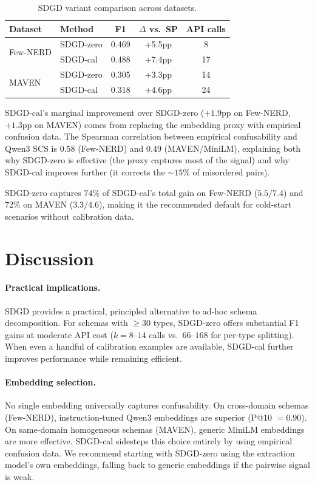 \documentclass[11pt,a4paper]{article}
\begin{document}
\begin{table}[t]
\centering
\small
\caption{SDGD variant comparison across datasets.}
\label{tab:sdgd-variants}
\begin{tabular}{llccc}
\toprule
Dataset & Method & F1 & $\Delta$ vs.\ SP & API calls \\
\midrule
\multirow{2}{*}{Few-NERD} & SDGD-zero & 0.469 & +5.5pp & 8 \\
                          & SDGD-cal  & 0.488 & +7.4pp & 17 \\
\midrule
\multirow{2}{*}{MAVEN}    & SDGD-zero & 0.305 & +3.3pp & 14 \\
                          & SDGD-cal  & 0.318 & +4.6pp & 24 \\
\bottomrule
\end{tabular}
\end{table}

SDGD-cal's marginal improvement over SDGD-zero ($+1.9$pp on Few-NERD, $+1.3$pp on MAVEN) comes from replacing the embedding proxy with empirical confusion data.
The Spearman correlation between empirical confusability and Qwen3 SCS is $0.58$ (Few-NERD) and $0.49$ (MAVEN/MiniLM), explaining both why SDGD-zero is effective (the proxy captures most of the signal) and why SDGD-cal improves further (it corrects the $\sim\!15\%$ of misordered pairs).

SDGD-zero captures $74\%$ of SDGD-cal's total gain on Few-NERD ($5.5/7.4$) and $72\%$ on MAVEN ($3.3/4.6$), making it the recommended default for cold-start scenarios without calibration data.


\section{Discussion}
\label{sec:discussion}

\paragraph{Practical implications.}
SDGD provides a practical, principled alternative to ad-hoc schema decomposition.
For schemas with ${\geq}30$ types, SDGD-zero offers substantial F1 gains at moderate API cost ($k{=}8$--$14$ calls vs.\ $66$--$168$ for per-type splitting).
When even a handful of calibration examples are available, SDGD-cal further improves performance while remaining efficient.

\paragraph{Embedding selection.}
No single embedding universally captures confusability.
On cross-domain schemas (Few-NERD), instruction-tuned Qwen3 embeddings are superior (P@10 $= 0.90$).
On same-domain homogeneous schemas (MAVEN), generic MiniLM embeddings are more effective.
SDGD-cal sidesteps this choice entirely by using empirical confusion data.
We recommend starting with SDGD-zero using the extraction model's own embeddings, falling back to generic embeddings if the pairwise signal is weak.
\end{document}
